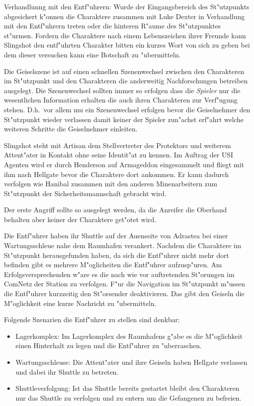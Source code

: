 Verhandlunng mit den Entf"uhrern: Wurde der Eingangsbereich des St"utzpunkts abgesichert k"onnen die Charaktere zusammen mit Luke Dexter in Verhandlung mit den Entf"uhrern treten oder die hinteren R"aume des St"utzpunktes st"urmen. Fordern die Charaktere nach einem Lebenszeichen ihrer Freunde kann Slingshot den entf"uhrten Charakter bitten ein kurzes Wort von sich zu geben bei dem dieser versuchen kann eine Botschaft zu "ubermitteln.

\begin{remarks}
	Die Geiselszene ist auf einen schnellen Szenenwechsel zwischen den Charakteren im St"utzpunkt und den Charakteren die anderweitig Nachforschungen betreiben ausgelegt. Die Szenenwechsel sollten immer so erfolgen dass die \emph{Spieler} nur die wesentlichen Information erhalten die auch ihren Charakteren zur Verf"ugung stehen. D.h.~vor allem mu\3 ein Szenenwechsel erfolgen bevor die Geiselnehmer den St"utzpunkt wieder verlassen damit keiner der Spieler zun"achst erf"ahrt welche weiteren Schritte die Geiselnehmer einleiten.

	Slingshot steht mit Artisan dem Stellvertreter des Protektors und weiterem Attent"ater in Kontakt ohne seine Identit"at zu kennen. Im Auftrag der USI Agenten wird er durch Henderson auf Armageddon eingesammelt und fliegt mit ihm nach Hellgate bevor die Charaktere dort ankommen. Er kann dadurch verfolgen wie Hanibal zusammen mit den anderen Minenarbeitern zum St"utzpunkt der Sicherheitsmannschaft gebracht wird.

	Der erste Angriff sollte so ausgelegt werden, da\3 die Anreifer die Oberhand behalten aber keiner der Charaktere get"otet wird.
\end{remarks}



Die Entf"uhrer haben ihr Shuttle auf der Au\3enseite von Adrastea bei einer Wartungsschleu\3e nahe dem Raumhafen verankert. Nachdem die Charaktere im St"utzpunkt herausgefunden haben, da\3 sich die Entf"uhrer nicht mehr dort befinden gibt es mehrere M"oglicheiten die Entf"uhrer aufzusp"uren. Am Erfolgsversprechenden w"are es die nach wie vor auftretenden St"orungen im ComNetz der Station zu verfolgen. F"ur die Navigation im St"utzpunkt m"ussen die Entf"uhrer kurzzeitig den St"orsender deaktivieren. Das gibt den Geiseln die M"oglichkeit eine kurze Nachricht zu "ubermitteln.

Folgende Szenarien die Entf"uhrer zu stellen sind denkbar:

\begin{itemize}
	\item Lagerkomplex: Im Lagerkomplex des Raumhafens g"abe es die M"oglichkeit einen Hinterhalt zu legen und die Entf"uhrer zu "uberraschen.
	\item Wartungsschleuse: Die Attent"ater und ihre Geiseln haben Hellgate verlassen und dabei ihr Shuttle zu betreten.
	\item Shuttleverfolgung: Ist das Shuttle bereits gestartet bleibt den Charakteren nur das Shuttle zu verfolgen und zu entern um die Gefangenen zu befreien.
\end{itemize}


